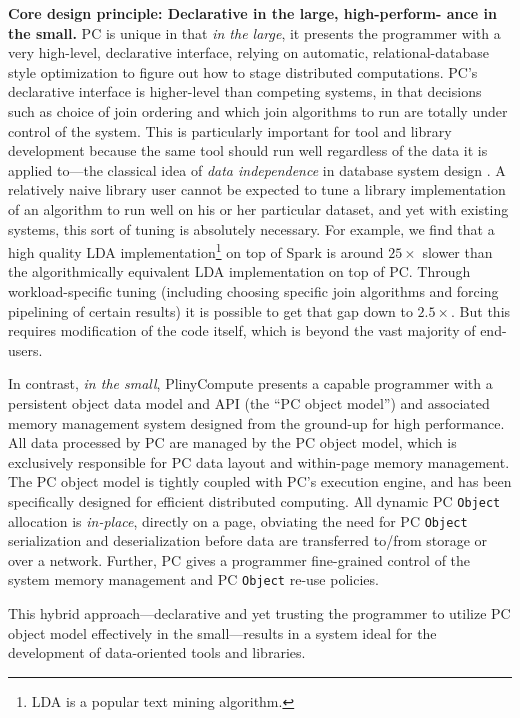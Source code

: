 \vspace{5 pt}
\noindent
\textbf{Core design principle: Declarative in the large, high-perform-
  ance in the small.}
PC is unique in that \emph{in the large}, 
it presents the programmer with a very high-level,
declarative interface, relying on automatic, 
relational-database style optimization \cite{chaudhuri1998overview} to figure out how to stage
distributed computations.  
PC's declarative interface is higher-level than competing systems, in that decisions such as choice of join ordering and which
join algorithms to run are
totally under control of the system. 
This is particularly important for tool and library development because the same tool should run well regardless of the data
it is applied to---the classical idea of \emph{data independence} in database system design \cite{stonebraker1990third}.
A relatively naive library user cannot be expected to tune a library implementation of an algorithm to run
well on his or her particular dataset, and yet with existing systems, this sort of tuning
is absolutely necessary.  For example, we find
that a high quality LDA implementation\footnote{LDA \cite{blei2003latent} is a popular text mining algorithm.}
on top of Spark is around $25\times$ slower than the algorithmically equivalent LDA
implementation on top of PC.  Through workload-specific tuning (including choosing specific join algorithms and
forcing pipelining of certain results) it is possible to get that gap down to $2.5\times$.  But this requires modification of the
code itself, which is beyond the vast majority of end-users.


In contrast, \emph{in the small}, PlinyCompute presents a capable programmer with a
persistent object data model and API (the ``PC object model'') and associated memory management system
designed from the ground-up for
high performance.
All data processed by PC are managed by
the PC object
model, which is exclusively responsible for PC data layout and within-page memory management.  
The PC object model is tightly coupled with
PC's execution engine, and has been specifically designed for efficient distributed computing.  
All dynamic PC \texttt{Object} allocation is \emph{in-place}, directly on a page, obviating
the need for PC \texttt{Object} serialization and deserialization
before data are transferred to/from storage or over a network.
Further, PC gives a programmer fine-grained control of the system
memory management and PC \texttt{Object} re-use policies.

This hybrid approach---declarative and yet trusting the programmer
to utilize PC object model effectively
in the small---results in a system ideal for the 
development of data-oriented tools and libraries.

